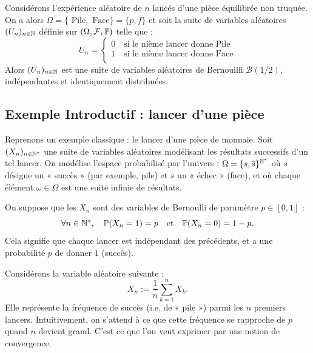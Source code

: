 \begin{example}[Simple]
    Considérons l'expérience aléatoire de $n$ lancés d'une pièce équilibrée non truquée. 
    On a alors $ \Omega = \{\text{ Pile}, \text{ Face}\} = \{p,f\}$ et soit la suite de variables 
    aléatoires $(U_n)_{n \in \mathbb{N}}$ définie sur $(\Omega, \mathcal{F}, \mathbb{P})$ telle que :
        \[ U_n = 
            \begin{cases}
                0 \quad \text{si le nième lancer donne Pile} \\ 
                1 \quad \text{si le nième lancer donne Face} \\ 
            \end{cases}
        \]
    Alors $(U_n)_{n \in \mathbb{N}}$ est une suite de variables aléatoires de Bernouilli $ \mathcal{B}(1/2)$, 
    indépendantes et identiquement distribuées. 
\end{example}


\subsection{Exemple Introductif : lancer d'une pièce}

Reprenons un exemple classique : le lancer d’une pièce de monnaie. Soit $(X_n)_{n \in \mathbb{N}^*}$ une suite 
de variables aléatoires modélisant les résultats successifs d’un tel lancer. On modélise l’espace probabilisé 
par l'univers : $\Omega = \{s, \overline{s}\}^{\mathbb{N}^*} $ où $s$ désigne un « succès » (par exemple, pile) 
et $\overline{s}$ un « échec » (face), et où chaque élément $\omega \in \Omega$ est une suite infinie de 
résultats.

On suppose que les $X_n$ sont des variables de Bernoulli de paramètre $p \in [0,1]$ :
    \[
        \forall n \in \mathbb{N}^*,\quad \mathbb{P}(X_n = 1) = p \quad \text{et} \quad \mathbb{P}(X_n = 0) = 1 - p.
    \]
Cela signifie que chaque lancer est indépendant des précédents, et a une probabilité $p$ de donner $1$ (succès).

\vspace{0.3cm}

Considérons la variable aléatoire suivante :
    \[
        X_n := \frac{1}{n} \sum_{k=1}^n X_k.
    \]
Elle représente la fréquence de succès (i.e. de « pile ») parmi les $n$ premiers lancers.
Intuitivement, on s’attend à ce que cette fréquence se rapproche de $p$ quand $n$ devient grand. 
C’est ce que l’on veut exprimer par une notion de convergence.

\vspace{0.3cm}

